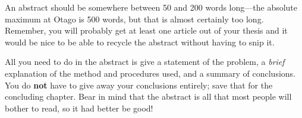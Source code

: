 An abstract should be somewhere between 50 and
200 words long---the
absolute maximum at Otago is 500 words, but that is almost certainly
too long.  Remember, you will probably get at least one article out of
your thesis and it would be nice to be able to recycle the abstract
without having to snip it.

All you need to do in the abstract is give a statement of the problem,
a {\em brief} explanation of the method and procedures used, and a
summary of conclusions.  You do {\bf not} have to give away your
conclusions entirely; save that for the concluding chapter.  Bear in
mind that the abstract is all that most people will bother to read, so
it had better be good!
